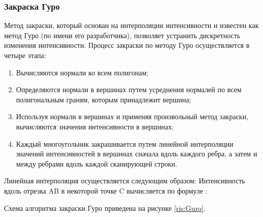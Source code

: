 \documentclass[54pt, a4paper]{article}
\begin{document}
	
	\newpage
	
	\subsubsection{Закраска Гуро}
	
	Метод закраски, который основан на интерполяции интенсивности и известен как метод Гуро (по имени его разработчика), позволяет устранить дискретность изменения интенсивности. Процесс закраски по методу Гуро осуществляется в четыре этапа:
	
	\begin{enumerate}
		\item Вычисляются нормали ко всем полигонам;
		\item Определяются нормали в вершинах путем усреднения нормалей по всем полигональным граням, которым принадлежит вершина;
		\item Используя нормали в вершинах и применяя произвольный метод закраски, вычисляются значения интенсивности в вершинах;
		\item Каждый многоугольник закрашивается путем линейной интерполяции значений интенсивностей в вершинах сначала вдоль каждого ребра, а затем и между ребрами вдоль каждой сканирующей строки.
	\end{enumerate}

	Линейная интерполяция осуществляется следующим образом:
	Интенсивность вдоль отрезка AB в некоторой точке C вычисляется по формуле \cite{Guro}:
	
	Схема алгоритма закраски Гуро приведена на рисунке \ref{ris:Guro}.
	
\end{document}
